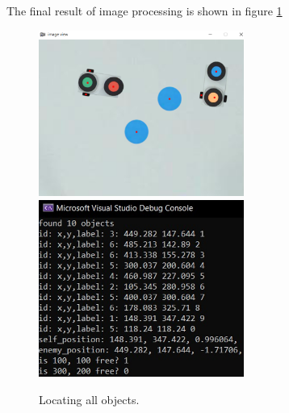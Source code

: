 The final result of image processing is shown in figure \ref{IP_result} 
    \begin{figure}[thb]
        \centering
        \includegraphics[width=0.6\textwidth]{images/IP_result.png}
        \includegraphics[width=0.6\textwidth]{images/IP_result2.png}
        \caption[Locating all objects]{Locating all objects.}\label{IP_result}
    \end{figure}
